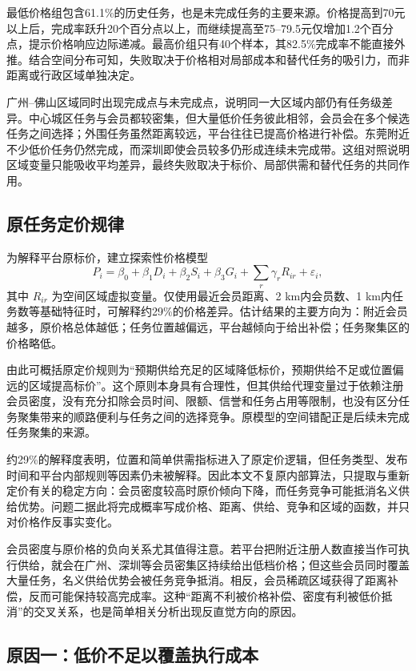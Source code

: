 ﻿\documentclass[UTF8,zihao=-4,a4paper,fontset=fandol]{ctexart}
\begin{document}
最低价格组包含61.1\%的历史任务，也是未完成任务的主要来源。价格提高到70元以上后，完成率跃升20个百分点以上，而继续提高至75--79.5元仅增加1.2个百分点，提示价格响应边际递减。最高价组只有40个样本，其82.5\%完成率不能直接外推。结合空间分布可知，失败取决于价格相对局部成本和替代任务的吸引力，而非距离或行政区域单独决定。

广州--佛山区域同时出现完成点与未完成点，说明同一大区域内部仍有任务级差异。中心城区任务与会员都较密集，但大量低价任务彼此相邻，会员会在多个候选任务之间选择；外围任务虽然距离较远，平台往往已提高价格进行补偿。东莞附近不少低价任务仍然完成，而深圳即使会员较多仍形成连续未完成带。这组对照说明区域变量只能吸收平均差异，最终失败取决于标价、局部供需和替代任务的共同作用。

\subsection{原任务定价规律}

为解释平台原标价，建立探索性价格模型
\begin{equation}
P_i=\beta_0+\beta_1D_i+\beta_2S_i+\beta_3G_i
+\sum_r\gamma_rR_{ir}+\varepsilon_i,
\label{eq:price-model}
\end{equation}
其中 $R_{ir}$ 为空间区域虚拟变量。仅使用最近会员距离、2 km内会员数、1 km内任务数等基础特征时，可解释约29\%的价格差异。估计结果的主要方向为：附近会员越多，原价格总体越低；任务位置越偏远，平台越倾向于给出补偿；任务聚集区的价格略低。

由此可概括原定价规则为“预期供给充足的区域降低标价，预期供给不足或位置偏远的区域提高标价”。这个原则本身具有合理性，但其供给代理变量过于依赖注册会员密度，没有充分扣除会员时间、限额、信誉和任务占用等限制，也没有区分任务聚集带来的顺路便利与任务之间的选择竞争。原模型的空间错配正是后续未完成任务聚集的来源。

约29\%的解释度表明，位置和简单供需指标进入了原定价逻辑，但任务类型、发布时间和平台内部规则等因素仍未被解释。因此本文不复原内部算法，只提取与重新定价有关的稳定方向：会员密度较高时原价倾向下降，而任务竞争可能抵消名义供给优势。问题二据此将完成概率写成价格、距离、供给、竞争和区域的函数，并只对价格作反事实变化。

会员密度与原价格的负向关系尤其值得注意。若平台把附近注册人数直接当作可执行供给，就会在广州、深圳等会员密集区持续给出低档价格；但这些会员同时覆盖大量任务，名义供给优势会被任务竞争抵消。相反，会员稀疏区域获得了距离补偿，反而可能保持较高完成率。这种“距离不利被价格补偿、密度有利被低价抵消”的交叉关系，也是简单相关分析出现反直觉方向的原因。

\subsection{原因一：低价不足以覆盖执行成本}
\end{document}
